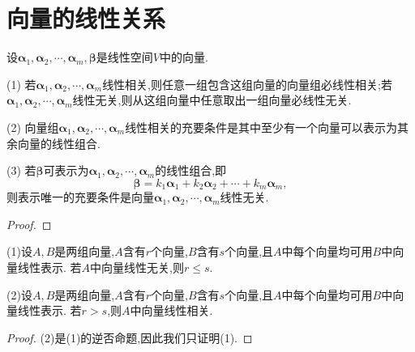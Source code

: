 \documentclass[../../main.tex]{subfiles}
\begin{document}
\section{向量的线性关系}

\begin{theorem}\label{theorem:向量的线性关系定理1}
设\(\boldsymbol{\alpha}_1,\boldsymbol{\alpha}_2,\cdots,\boldsymbol{\alpha}_m,\boldsymbol{\beta}\)是线性空间\(V\)中的向量.

(1) 若\(\boldsymbol{\alpha}_1,\boldsymbol{\alpha}_2,\cdots,\boldsymbol{\alpha}_m\)线性相关,则任意一组包含这组向量的向量组必线性相关;若\(\boldsymbol{\alpha}_1,\boldsymbol{\alpha}_2,\cdots,\boldsymbol{\alpha}_m\)线性无关,则从这组向量中任意取出一组向量必线性无关.

(2) 向量组\(\boldsymbol{\alpha}_1,\boldsymbol{\alpha}_2,\cdots,\boldsymbol{\alpha}_m\)线性相关的充要条件是其中至少有一个向量可以表示为其余向量的线性组合.

(3) 若\(\boldsymbol{\beta}\)可表示为\(\boldsymbol{\alpha}_1,\boldsymbol{\alpha}_2,\cdots,\boldsymbol{\alpha}_m\)的线性组合,即
\[
\boldsymbol{\beta}=k_1\boldsymbol{\alpha}_1 + k_2\boldsymbol{\alpha}_2+\cdots + k_m\boldsymbol{\alpha}_m,
\]
则表示唯一的充要条件是向量\(\boldsymbol{\alpha}_1,\boldsymbol{\alpha}_2,\cdots,\boldsymbol{\alpha}_m\)线性无关.
\end{theorem}
\begin{proof}

\end{proof}

\begin{theorem}\label{theorem:向量的线性关系定理2}
(1)设\(A,B\)是两组向量,\(A\)含有\(r\)个向量,\(B\)含有\(s\)个向量,且\(A\)中每个向量均可用\(B\)中向量线性表示. 若\(A\)中向量线性无关,则\(r\leq s\).

(2)设\(A,B\)是两组向量,\(A\)含有\(r\)个向量,\(B\)含有\(s\)个向量,且\(A\)中每个向量均可用\(B\)中向量线性表示. 若\(r > s\),则\(A\)中向量线性相关.
\end{theorem}
\begin{proof}
(2)是(1)的逆否命题,因此我们只证明(1).
\end{proof}
\end{document}
